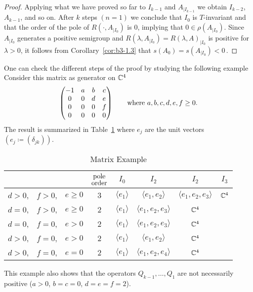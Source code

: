 \begin{proof}
	Applying what we have proved so far to $I_{k-1}$ and $A_{|I_{k-1}}$ we obtain $I_{k-2}$, $A_{k-1}$, and so on.
	After $k$ steps $(n=1)$ we conclude that $I_{0}$ is $T$-invariant and that the order of the pole of $R(\cdot,A_{|I_{0}})$ is $0$, 
	implying that $0 \in \rho(A_{|I_{0}})$.
	Since $A_{|I_{0}}$ generates a positive semigroup and $R(\lambda,A_{|I_{0}}) = R(\lambda,A)_{|I_{0}}$ is positive for $\lambda > 0$, it follows from Corollary~\ref{cor:b3-1.3} that $s(A_{0}) = s(A_{|I_{0}}) < 0$\,.
\end{proof}
One can check the different steps of the proof by studying the following example
Consider this matrix as generator on $\mathbb{C}^{4}$
\[
\begin{pmatrix}
	-1 & a & b & c \\
	0 & 0 & d & e \\
	0 & 0 & 0 & f \\
	0 & 0 & 0 & 0
\end{pmatrix}
\quad \quad \text{where $ a,b,c,d,e,f \geq 0 $.} 
\]
The result is summarized in Table~\ref{tab:b3-table1} where 
$e_{j}$ are the unit vectors $(e_{j} \coloneqq (\delta_{jk}))$.
\begin{table}[ht!]%
% 
\begin{center}
 \caption{Matrix Example}\label{tab:b3-table1}
\begin{tabular}{lll|c|cccc} %
		 &&& $ \overset{\text{\normalsize pole}}{\text{order}}$ & $I_0$ & $I_2$ & $I_2$ & $I_3$ \\[1ex]\hline
		$ d > 0 $, & $ f>0 $, &  $ e \ge 0 $ & 3 & $\langle e_1 \rangle$ &  $\langle e_1, e_2 \rangle$ &  $\langle e_1, e_2, e_3 \rangle$ &  $\mathbb{C}^4$\\
		$ d = 0 $, & $ f > 0 $, & $ e \ge 0 $ & 2 & $\langle e_1 \rangle$ &  $\langle e_1, e_2, e_3 \rangle$ &  $\mathbb{C}^4$ & \\	
		$ d = 0 $, & $ f = 0 $, & $ e > 0 $ & 2 & $\langle e_1 \rangle$ &  $\langle e_1, e_2, e_3 \rangle$ &  $\mathbb{C}^4$ & \\
		$ d > 0 $, & $ f = 0 $, & $ e > 0 $ & 2 & $\langle e_1 \rangle$ &  $\langle e_1, e_2 \rangle$ &  $\mathbb{C}^4$ & \\			
		$ d > 0 $, & $ f = 0 $, & $ e = 0 $ & 2 & $\langle e_1 \rangle$ &  $\langle e_1, e_2, e_4 \rangle$ &  $\mathbb{C}^4$ & \\	
\end{tabular}
\end{center}
\end{table}
This example also shows that the operators $Q_{k-1}, \ldots, Q_{1}$ are not necessarily positive (\eg $a>0$, $b=c=0$, $d=e=f=2$).

